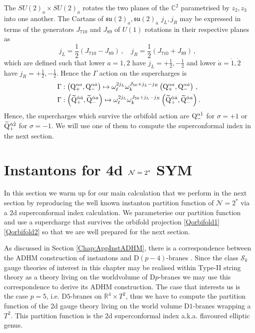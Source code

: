 \documentclass[main.tex]{subfiles}
\begin{document}
The $SU(2)_{a}\times SU(2)_{\dot a}$ rotates the two planes of the $\mathbb{C}^2$ parametrised by $z_2,z_3$ into one another. The Cartans of $\mathfrak{su}(2)_{a},\mathfrak{su}(2)_{\dot a}$ $j_L,j_R$ may be expressed in terms of the generators $J_{710}$ and $J_{89}$ of $U(1)$ rotations in their respective planes as
\begin{equation}
\label{eq:RsymmetryRotations}
j_L=\frac{1}{2}\left(J_{710}-J_{89}\right)\,,\quad j_R=\frac{1}{2}\left(J_{710}+J_{89}\right)\,,
\end{equation}
which are defined such that lower $a=1,2$ have $j_L=+\frac{1}{2},-\frac{1}{2}$ and lower $\dot{a}=\dot1,\dot2$ have $j_R=+\frac{1}{2},-\frac{1}{2}$. Hence the $\Gamma$ action on the supercharges is 
\begin{align}
\label{Qorbifold1}
&\Gamma:\left(\mathrm{Q}^{\alpha a}_{+},\mathrm{Q}^{\alpha \dot a}_{-}\right)\mapsto\omega_{\ell}^{2j_L}\omega_k^{J_{56}+j_L-j_R}\left(\mathrm{Q}^{\alpha a}_{+},\mathrm{Q}^{\alpha \dot a}_{-}\right)\,,\\\
\label{Qorbifold2}
&\Gamma:\left(\widetilde{\mathrm{Q}}^{\dot\alpha\dot a}_{+},\widetilde{\mathrm{Q}}^{\dot\alpha a}_{-}\right)\mapsto\omega_{\ell}^{2j_L}\omega_k^{J_{56}+j_L-j_R}\left(\widetilde{\mathrm{Q}}^{\dot\alpha\dot a}_{+},\widetilde{\mathrm{Q}}^{\dot\alpha a}_{-}\right).
\end{align}
Hence, the supercharges which survive the orbifold action are $\mathrm{Q}^{\alpha\dot1}_{-}$ for $\sigma=+1$ or $\widetilde{\mathrm{Q}}^{\dot\alpha\dot2}_{+}$ for $\sigma=-1$.
We will use one of them to compute the superconformal index in the next section.

\section{Instantons for 4d \texorpdfstring{$\mathcal{N}=2^*$}{N=2*} SYM}\label{Sec:2star}
In this section we warm up for our main calculation that we perform in the next section by reproducing the well known instanton partition function of $\mathcal{N}=2^*$ via a 2d superconformal index calculation.
We parameterise our partition function and use a supercharge that survives the orbifold projection \eqref{Qorbifold1} \eqref{Qorbifold2} so that we are well prepared for the next section.

As discussed in Section \ref{Chap:AppInstADHM}, there is a correspondence between the ADHM construction of instantons \cite{Atiyah:1978ri} and D$(p-4)$-branes \cite{Douglas:1996uz,Douglas:1995bn,Witten:1994tz,Tong:2005un,Polchinski:1996na}. Since the class $\mathcal{S}_k$ gauge theories of interest in this chapter may be realised within Type-II string theory as a theory living on the worldvolume of D$p$-branes we may use this correspondence to derive its ADHM construction.
The case that interests us is the case $p=5$, i.e. D$5$-branes on $\mathbb{R}^4\times T^2$, thus we have to compute the partition function of the 2d gauge theory living on the world volume D$1$-branes wrapping a $T^2$. This partition function is the 2d superconformal index a.k.a. flavoured elliptic genus.
\end{document}
